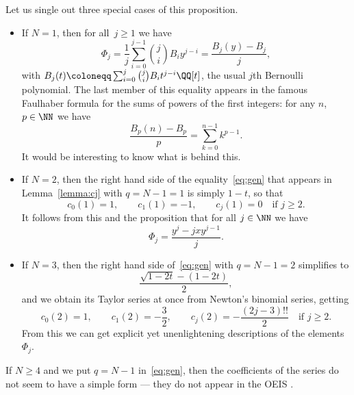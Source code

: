 Let us single out three special cases of this proposition.
\begin{itemize}

\item If $N=1$, then for all~$j\geq1$ we have
  \[ \label{eq:bern}
  \Phi_j = \frac{1}{j}\sum_{i=0}^{j-1}\binom{j}{i}B_iy^{j-i}
        = \frac{B_j(y)-B_j}{j}, 
  \]
with $B_j(t)\coloneqq\sum_{i=0}^j\binom{j}{i}B_it^{j-i}\QQ[t]$, the usual
$j$th Bernoulli polynomial. The last member of this equality appears in the
famous Faulhaber formula for the sums of powers of the first integers: for
any $n$,~$p\in\NN$ we have
  \[
  \frac{B_p(n) - B_p}{p} = \sum_{k=0}^{n-1} k^{p-1}.
  \]
It would be interesting to know what is behind this.

\item If $N=2$, then the right hand side of the equality~\eqref{eq:gen}
that appears in
Lemma~\ref{lemma:cj} with $q=N-1=1$ is simply $1-t$, so that
  \[
  c_0(1) = 1, 
  \qquad
  c_1(1) = -1,
  \qquad
  c_j(1) = 0 \quad\text{if $j\geq2$.}
  \]
It follows from this and the proposition that for all $j\in\NN$ we have
  \[
  \Phi_j
        = \frac{y^j-jxy^{j-1}}{j}.
  \]

\item If $N=3$, then the right hand side of~\eqref{eq:gen}  with $q=N-1=2$
simplifies to 
  \[
  \frac{\sqrt{1-2t}-(1-2t)}{2},
  \]
and we obtain its Taylor series at once from Newton's binomial series,
getting
  \[
  c_0(2) = 1, 
  \qquad
  c_1(2) = -\frac{3}{2},
  \qquad
  c_j(2) = -\frac{(2j-3)!!}{2} \quad\text{if $j\geq2$.}
  \]
From this we can get explicit yet unenlightening  descriptions of the
elements~$\Phi_j$.

\end{itemize}
If $N\geq4$ and we put $q=N-1$ in~\eqref{eq:gen}, then the coefficients of
the series do not seem to have a simple form --- they do not appear in the
OEIS \cite{OEIS}. 

